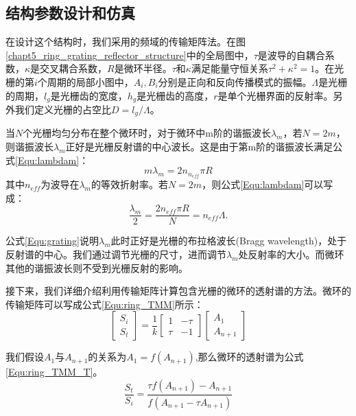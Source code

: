 \subsection{结构参数设计和仿真}
在设计这个结构时，我们采用的频域的传输矩阵法\cite{yariv2006photonics}。在图\ref{chapt5_ring_grating_reflector_structure}中的全局图中，$\tau$是波导的自耦合系数，$\kappa$是交叉耦合系数，$R$是微环半径。$\tau$和$\kappa$满足能量守恒关系$\tau^2+\kappa^2=1$。在光栅的第$i$个周期的局部小图中，$A_i, B_i$分别是正向和反向传播模式的振幅。$\Lambda$是光栅的周期，$l_g$是光栅齿的宽度，$h_g$是光栅齿的高度，$r$是单个光栅界面的反射率。另外我们定义光栅的占空比$D=l_g/\Lambda$。

当$N$个光栅均匀分布在整个微环时，对于微环中m阶的谐振波长$\lambda_m$，若$N = 2m$，则谐振波长$\lambda_m$正好是光栅反射谱的中心波长。这是由于第m阶的谐振波长满足公式\ref{Equ:lambdam}：
\begin{equation}
\label{Equ:lambdam}
m\lambda_m = 2n_{n_{eff}}\pi R
\end{equation}
其中$n_{eff}$为波导在$\lambda_m$的等效折射率。若$N=2m$，则公式\ref{Equ:lambdam}可以写成：
\begin{equation}
\label{Equ:grating}
\frac{\lambda_m}{2}=\frac{2n_{eff}\pi R}{N}=n_{eff}\Lambda.
\end{equation}

公式\ref{Equ:grating}说明$\lambda_m$此时正好是光栅的布拉格波长(Bragg wavelength)，处于反射谱的中心。我们通过调节光栅的尺寸，进而调节$\lambda_m$处反射率的大小。而微环其他的谐振波长则不受到光栅反射的影响。 

接下来，我们详细介绍利用传输矩阵计算包含光栅的微环的透射谱的方法。微环的传输矩阵可以写成公式\ref{Equ:ring_TMM}所示：
\begin{equation}
\label{Equ:ring_TMM}
\begin{bmatrix}
S_{i}\\
S_{t}
\end{bmatrix} =\frac{1}{k}\begin{bmatrix}
1 & -\tau\\
\tau & -1
\end{bmatrix}
\begin{bmatrix}
A_{1}\\
A_{n+1}
\end{bmatrix}
\end{equation}

我们假设$A_1$与$A_{n+1}$的关系为$A_1=f(A_{n+1})$,那么微环的透射谱为公式\ref{Equ:ring_TMM_T}。
\begin{equation}
\label{Equ:ring_TMM_T}
\frac{S_t}{S_i}=\frac{\tau f(A_{n+1})-A_{n+1}}{f(A_{n+1}-\tau A_{n+1})}
\end{equation}

